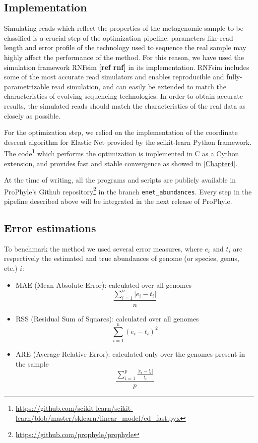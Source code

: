 \subsection{Implementation}

Simulating reads which reflect the properties of the metagenomic sample to be classified is a crucial step of the optimization pipeline: parameters like read length and error profile of the technology used to sequence the real sample may highly affect the performance of the method. For this reason, we have used the simulation framework RNFsim \textbf{[ref rnf]} in its implementation. RNFsim includes some of the most accurate read simulators and enables reproducible and fully-parametrizable read simulation, and can easily be extended to match the characteristics of evolving sequencing technologies. In order to obtain accurate results, the simulated reads should match the characteristics of the real data as closely as possible.

For the optimization step, we relied on the implementation of the coordinate descent algorithm for Elastic Net provided by the scikit-learn Python framework. The code\footnote{\url{https://github.com/scikit-learn/scikit-learn/blob/master/sklearn/linear_model/cd_fast.pyx}} which performs the optimization is implemented in C as a Cython extension, and provides fast and stable convergence as showed in \ref{Chapter4}.

At the time of writing, all the programs and scripts are publicly available in ProPhyle's Github repository\footnote{\url{https://github.com/prophyle/prophyle}} in the branch \texttt{enet\_abundances}. Every step in the pipeline described above will be integrated in the next release of ProPhyle.

\subsection{Error estimations}

To benchmark the method we used several error measures, where $e_i$ and $t_i$ are respectively the estimated and true abundances of genome (or species, genus, etc.) $i$:
\begin{itemize}
  \item MAE (Mean Absolute Error): calculated over all genomes
  \begin{equation*}
    \frac{\sum_{i=1}^n |e_i - t_i|}{n}
  \end{equation*}
  \item RSS (Residual Sum of Squares): calculated over all genomes
  \begin{equation*}
    \sum_{i=1}^n (e_i - t_i)^2
  \end{equation*}
  \item ARE (Average Relative Error): calculated only over the genomes present in the sample
  \begin{equation*}
    \frac{\sum_{i=1}^p \frac{|e_i - t_i|}{t_i}}{p}
  \end{equation*}
\end{itemize}
